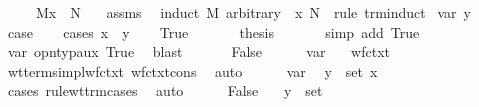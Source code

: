\begin{isabellebody}
\ \ \ {\isachardoublequoteopen}{\isasymGamma}\ {\isasymturnstile}\ M{\isacharbrackleft}x\ {\isacharcolon}{\isacharcolon}{\isacharequal}\ N{\isacharbrackright}\ {\isacharcolon}\ {\isasymsigma}{\isachardoublequoteclose}\isanewline
%
\isadelimproof
%
\endisadelimproof
%
\isatagproof
{}\isamarkupfalse%
\ assms\ \isamarkupfalse%
\ {\isacharparenleft}induct\ M\ arbitrary{\isacharcolon}\ {\isasymGamma}\ x\ N\ {\isasymsigma}\ rule{\isacharcolon}\ trm{\isachardot}induct{\isacharparenright}\isanewline
{}\isamarkupfalse%
\ {\isacharparenleft}var\ y{\isacharparenright}\isanewline
\ \ \isamarkupfalse%
\ {\isacharquery}case\isanewline
\ \ \isamarkupfalse%
\ {\isacharparenleft}cases\ {\isachardoublequoteopen}x\ {\isacharequal}\ y{\isachardoublequoteclose}{\isacharparenright}\isanewline
\ \ \isamarkupfalse%
\ True\ \isanewline
\ \ \ \ \isamarkupfalse%
\ {\isacharquery}thesis\ \isanewline
\ \ \ \ \isamarkupfalse%
\ {\isacharparenleft}simp\ add{\isacharcolon}\ True{\isacharparenright}\isanewline
\ \ \ \ \isamarkupfalse%
\ var\ opn{\isacharunderscore}typ{\isacharunderscore}aux\ True\ \isamarkupfalse%
\ blast\isanewline
\ \ \isamarkupfalse%
\isanewline
\ \ \isamarkupfalse%
\ False\isanewline
\ \ \ \ \isamarkupfalse%
\ var\ \isamarkupfalse%
\ {}{\isacharcolon}\ {\isachardoublequoteopen}wf{\isacharunderscore}ctxt\ {\isasymGamma}{\isachardoublequoteclose}\ \isamarkupfalse%
\ wt{\isacharunderscore}terms{\isacharunderscore}impl{\isacharunderscore}wf{\isacharunderscore}ctxt\ wf{\isacharunderscore}ctxt{\isacharunderscore}cons\ \isamarkupfalse%
\ auto\isanewline
\ \ \ \ \isamarkupfalse%
\ var\ \isamarkupfalse%
\ {\isachardoublequoteopen}{\isacharparenleft}y{\isacharcomma}{\isasymsigma}{\isacharparenright}\ {\isasymin}\ set\ {\isacharparenleft}{\isacharparenleft}x{\isacharcomma}\ {\isasymtau}{\isacharparenright}\ {\isacharhash}\ {\isasymGamma}{\isacharparenright}{\isachardoublequoteclose}\ \isamarkupfalse%
\ {\isacharparenleft}cases\ rule{\isacharcolon}wt{\isacharunderscore}trm{\isachardot}cases{\isacharparenright}\ \isamarkupfalse%
\ auto\isanewline
\ \ \ \ \isamarkupfalse%
\ False\ \isamarkupfalse%
\ {}{\isacharcolon}\ {\isachardoublequoteopen}{\isacharparenleft}y{\isacharcomma}{\isasymsigma}{\isacharparenright}\ {\isasymin}\ set\ {\isasymGamma}{\isachardoublequoteclose}\ \isamarkupfalse%

\end{isabellebody}
